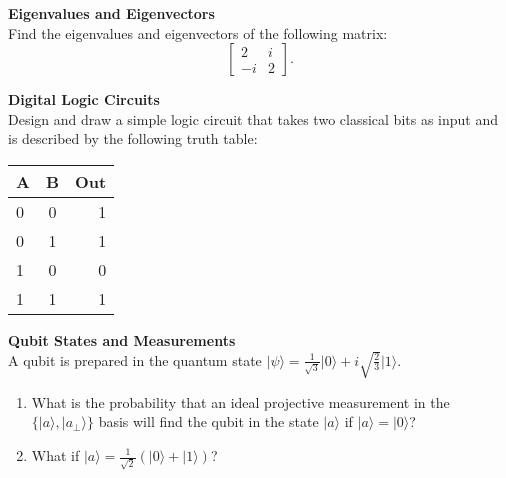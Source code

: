 \documentclass[12pt,letterpaper,boxed,cm]{hmcpset}
\newcommand{\ket}[1]{\big\lvert #1\big\rangle}
\begin{document}

\begin{problem}[1]
    \textbf{Eigenvalues and Eigenvectors}\\
    Find the eigenvalues and eigenvectors of the following matrix: 
    \[
        \begin{bmatrix} 2 & i \\ -i & 2 \end{bmatrix}.
    \]
\end{problem}

\begin{solution}
    \vfill
\end{solution}
\newpage

\begin{problem}[2]
    \textbf{Digital Logic Circuits}\\
    Design and draw a simple logic circuit that takes two classical bits as input and is described by the following truth table:
    \begin{center}
        \begin{tabular}{l c || r}
            A & B & Out \\
            \hline
            0 & 0 & 1 \\
            0 & 1 & 1 \\
            1 & 0 & 0 \\
            1 & 1 & 1 
        \end{tabular}
    \end{center}
\end{problem}

\begin{solution}
    \vfill
\end{solution}
\newpage

\begin{problem}[3]
    \textbf{Qubit States and Measurements}\\
    A qubit is prepared in the quantum state $\ket{\psi} = \frac{1}{\sqrt{3}}\ket{0} + i\sqrt{\frac{2}{3}}\ket{1}$.
    \begin{enumerate}
        \item What is the probability that an ideal projective measurement in the $\{\ket{a},\ket{a_{\perp}}\}$ basis will find the qubit in the state $\ket{a}$ if $\ket{a} = \ket{0}$?
        \item What if $\ket{a} = \frac{1}{\sqrt{2}}(\ket{0}+\ket{1})$?
    \end{enumerate}
\end{problem}
\end{document}
